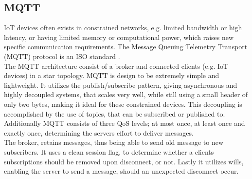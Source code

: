 \subsection{MQTT}
IoT devices often exists in constrained networks, e.g. limited bandwidth or high latency, or having limited memory or computational power, which raises new specific communication requirements. The Message Queuing Telemetry Transport (MQTT) protocol is an ISO standard \cite{developing_standards_2016}.\\

The MQTT architecture consist of a broker and connected clients (e.g. IoT devices) in a star topology. MQTT is design to be extremely simple and lightweight. It utilizes the publish/subscribe pattern, giving asynchronous and highly decoupled systems, that scales very well, while still using a small header of only two bytes, making it ideal for these constrained devices. This decoupling is accomplished by the use of topics, that can be subscribed or published to. Additionally MQTT consists of three QoS levels; at most once, at least once and exactly once, determining the servers effort to deliver messages\cite{MQTTBook}.\\

The broker, retains messages, thus being able to send old message to new subscribers. It uses a clean session flag, to determine whether a clients subscriptions should be removed upon disconnect, or not. Lastly it utilizes wills, enabling the server to send a message, should an unexpected disconnect occur\cite{MQTTBook}.